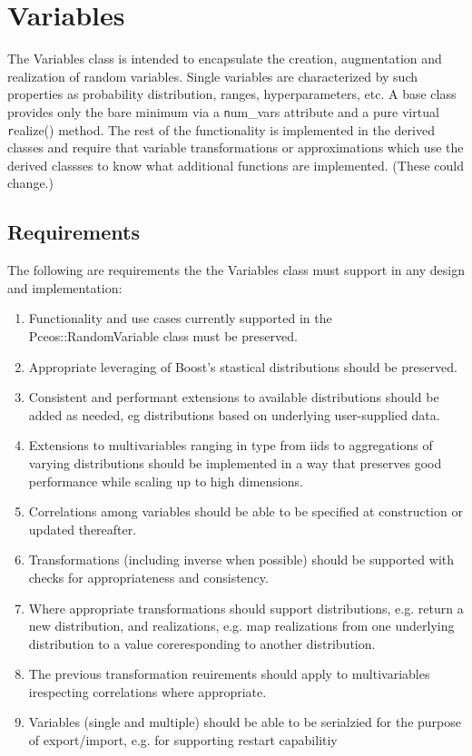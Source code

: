 

\section{Variables}

The Variables class is intended to encapsulate the creation, augmentation
and realization of random variables.  Single variables are characterized
by such properties as probability distribution, ranges, hyperparameters,
etc. A base class provides only the bare minimum via a {\texttt num\_vars}
attribute and a pure virtual {\texttt realize()} method. The rest of
the functionality is implemented in the derived classes and require that
variable transformations or approximations which use the derived classses
to know what additional functions are implemented. (These could change.)

\subsection{Requirements}

The following are requirements the the Variables class must support in any design and
implementation:

\begin{enumerate}
  \item Functionality and use cases currently supported in the
        Pceos::RandomVariable class must be preserved.
  \item Appropriate leveraging of Boost's stastical distributions should
        be preserved.
  \item Consistent and performant extensions to available distributions
        should be added as needed, eg distributions based on underlying
        user-supplied data.
  \item Extensions to multivariables ranging in type from iids to
        aggregations of varying distributions should be implemented
        in a way that preserves good performance while scaling up to
        high dimensions.
  \item Correlations among variables should be able to be specified at
        construction or updated thereafter.
  \item Transformations (including inverse when possible) should be supported
        with checks for appropriateness and consistency.
  \item Where appropriate transformations should support distributions, e.g.
        return a new distribution, and realizations, e.g. map realizations from
        one underlying distribution to a value coreresponding to another distribution.
  \item The previous transformation reuirements should apply to multivariables
        irespecting correlations where appropriate.
  \item Variables (single and multiple) should be able to be serialzied for the 
        purpose of export/import, e.g. for supporting restart capabilitiy
\end{enumerate}



